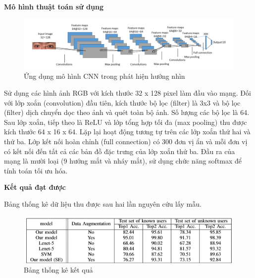 \textbf{Mô hình thuật toán sử dụng}

\begin{center}
    \begin{figure}[h!]
    \begin{center}
     \includegraphics[scale=0.4]{img/yeycnn.png}
    \end{center}
    \caption{Ứng dụng mô hình CNN trong phát hiện hướng nhìn}
    \label{refhinh16}
    \end{figure}
\end{center}

Sử dụng các hình ảnh RGB với kích thước 32 x 128 pixel làm đầu vào mạng. Đối với lớp xoắn (convolution) đầu tiên, kích thước bộ lọc (filter) là 3x3 và bộ lọc (filter) dịch chuyển dọc theo ảnh và quét toàn bộ ảnh. Số lượng các bộ lọc là 64. Sau lớp xoắn, tiếp theo là ReLU và lớp tổng hợp tối đa (max pooling) thu được kích thước 64 x 16 x 64. Lặp lại hoạt động tương tự trên các lớp xoắn thứ hai và thứ ba. Lớp kết nối hoàn chỉnh (full connection) có 300 đơn vị ẩn và mỗi đơn vị có kết nối đến tất cả các bản đồ đặc trưng của lớp xoắn thứ ba. Đầu ra của mạng là mười loại (9 hướng mắt và nháy mắt), sử dụng chức năng softmax để tính toán tối ưu hóa.

\textbf{Kết quả đạt được}

Bảng thống kê dữ liệu thu được sau hai lần nguyên cứu lấy mẫu.

\begin{center}
    \begin{figure}[h!]
    \begin{center}
     \includegraphics[scale=0.5]{img/table.png}
    \end{center}
    \caption{Bảng thống kê kết quả}
    \label{refhinh17}
    \end{figure}
\end{center}

